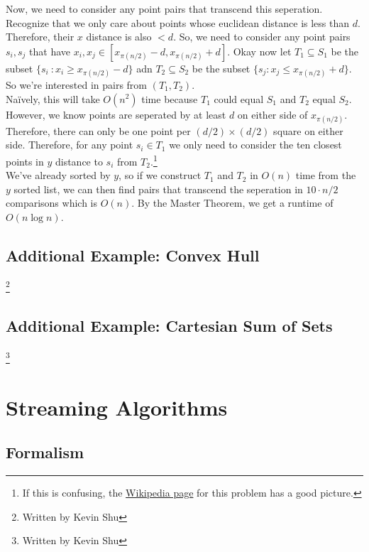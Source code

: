\documentclass[10pt]{article}
\theoremstyle{plain}
\theoremstyle{definition}
\numberwithin{equation}{section}
\numberwithin{figure}{section}
\begin{document}
\noindent Now, we need to consider any point pairs that transcend this seperation. Recognize that we only care about points whose euclidean distance is less than $d$. Therefore, their $x$ distance is also $< d$. So, we need to consider any point pairs $s_i, s_j$ that have $x_i, x_j \in [x_{\pi(n/2)}-d, x_{\pi(n/2)}+d]$. Okay now let $T_1 \subseteq S_1$ be the subset $\{s_i \ : x_i \geq x_{\pi(n/2)}-d\}$ adn $T_2 \subseteq S_2$ be the subset $\{s_j : x_j \leq x_{\pi(n/2)} + d\}$. So we're interested in pairs from $(T_1, T_2)$. \\

\noindent Na\"ively, this will take $O(n^2)$ time because $T_1$ could equal $S_1$ and $T_2$ equal $S_2$. However, we know points are seperated by at least $d$ on either side of $x_{\pi(n/2)}$. Therefore, there can only be one point per $(d/2) \times (d/2)$ square on either side. Therefore, for any point $s_i \in T_1$ we only need to consider the ten closest points in $y$ distance to $s_i$ from $T_2$.\footnote{If this is confusing, the \href{https://en.wikipedia.org/wiki/Closest_pair_of_points_problem}{Wikipedia page} for this problem has a good picture.} \\

\noindent We've already sorted by $y$, so if we construct $T_1$ and $T_2$ in $O(n)$ time from the $y$ sorted list, we can then find pairs that transcend the seperation in $10 \cdot n/2$ comparisons which is $O(n)$. By the Master Theorem, we get a runtime of $O(n \log n)$.

\subsection{Additional Example: Convex Hull}\footnote{Written by Kevin Shu}

\subsection{Additional Example: Cartesian Sum of Sets}\footnote{Written by Kevin Shu}

\newpage
\section{Streaming Algorithms}

\subsection{Formalism}
\end{document}
